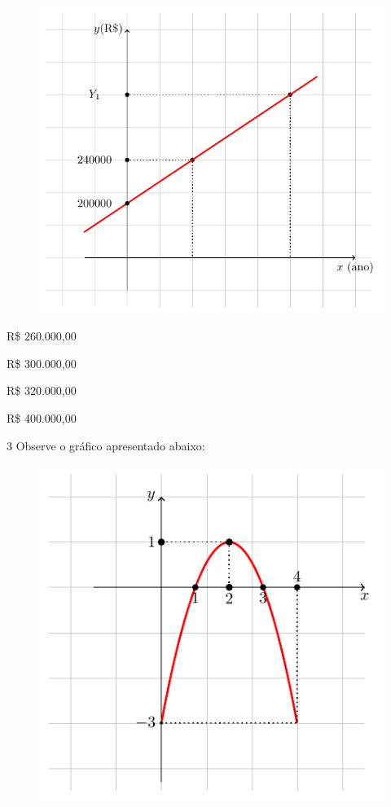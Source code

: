 \begin{figure}[htpb!]
\centering
\includegraphics[width=.7\textwidth]{./tikz/011.pdf}
\end{figure}

\begin{escolha}
\item R\$ 260.000,00

\item R\$ 300.000,00

\item R\$ 320.000,00

\item R\$ 400.000,00
\end{escolha}

\pagebreak
\num{3} Observe o gráfico apresentado abaixo:

\begin{figure}[htpb!]
\centering
\includegraphics[width=.7\textwidth]{./tikz/012.pdf}
\end{figure}

